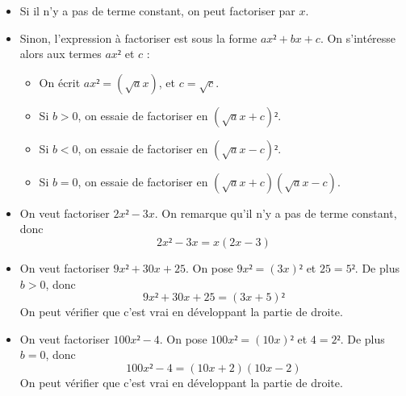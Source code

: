 \documentclass[
	classe=$2^{de}$
]{coursclass}
\begin{document}
\begin{greybox}[frametitle={Techniques de factorisation}]
	\begin{itemize}
		\item Si il n'y a pas de terme constant, on peut factoriser par $x$.
		\item Sinon, l'expression à factoriser est sous la forme $ax² + bx + c$. On s'intéresse alors aux termes $ax²$ et $c$ :
		      \begin{itemize}
			      \item On écrit $ax² = (\sqrt{a}x)$, et $c = \sqrt{c}$.
			      \item Si $b > 0$, on essaie de factoriser en $(\sqrt{a}x + c)²$.
			      \item Si $b < 0$, on essaie de factoriser en $(\sqrt{a}x - c)²$.
			      \item Si $b = 0$, on essaie de factoriser en $(\sqrt{a}x + c)(\sqrt{a}x - c)$.
		      \end{itemize}
	\end{itemize}
\end{greybox}

\begin{exemple}
	\begin{itemize}
		\item On veut factoriser $2x² - 3x$. On remarque qu'il n'y a pas de terme constant, donc
		      $$2x² - 3x = x(2x - 3)$$
		\item On veut factoriser $9x² + 30x + 25$. On pose $9x² = (3x)²$ et $25 = 5²$. De plus $b > 0$, donc
		      $$9x² + 30x + 25 = (3x + 5)²$$
		      On peut vérifier que c'est vrai en développant la partie de droite.
		\item On veut factoriser $100x² - 4$. On pose $100x² = (10x)²$ et $4 = 2²$. De plus $b = 0$, donc
		      $$100x² - 4 = (10x + 2)(10x - 2)$$
		      On peut vérifier que c'est vrai en développant la partie de droite.
	\end{itemize}
\end{exemple}
\end{document}
